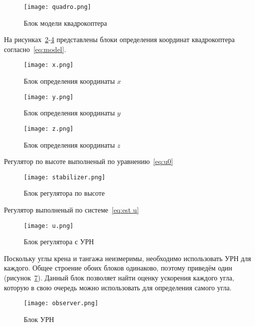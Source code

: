 \documentclass[14pt]{extarticle}
\begin{document}
    \begin{figure}[H]
        \centering
        \texttt{[image: quadro.png]}
        \caption{Блок модели квадрокоптера}
        \label{pic:quadro}
    \end{figure}

    На рисунках~\ref{pic:x}-\ref{pic:z} представлены блоки определения координат квадрокоптера согласно~\eqref{eq:model}.
    \begin{figure}[H]
        \centering
        \texttt{[image: x.png]}
        \caption{Блок определения координаты $x$}
        \label{pic:x}
    \end{figure}

    \begin{figure}[H]
        \centering
        \texttt{[image: y.png]}
        \caption{Блок определения координаты $y$}
        \label{pic:y}
    \end{figure}

    \begin{figure}[H]
        \centering
        \texttt{[image: z.png]}
        \caption{Блок определения координаты $z$}
        \label{pic:z}
    \end{figure}

    Регулятор по высоте выполненый по уравнению~\eqref{eq:u0}
    \begin{figure}[H]
        \centering
        \texttt{[image: stabilizer.png]}
        \caption{Блок регулятора по высоте}
        \label{pic:stab}
    \end{figure}

    Регулятор выполненый по системе~\eqref{eq:est u}
    \begin{figure}[H]
        \centering
        \texttt{[image: u.png]}
        \caption{Блок регулятора с УРН}
        \label{pic:u}
    \end{figure}

    Поскольку углы крена и тангажа неизмеримы, необходимо использовать УРН для каждого. Общее строение обоих блоков
    одинаково, поэтому приведём один (рисунок~\ref{pic:observer}). Данный блок позволяет найти оценку ускорения каждого
    угла, которую в свою очередь можно использовать для определения самого угла.

    \begin{figure}[H]
        \centering
        \texttt{[image: observer.png]}
        \caption{Блок УРН}
        \label{pic:observer}
    \end{figure}
\end{document}
